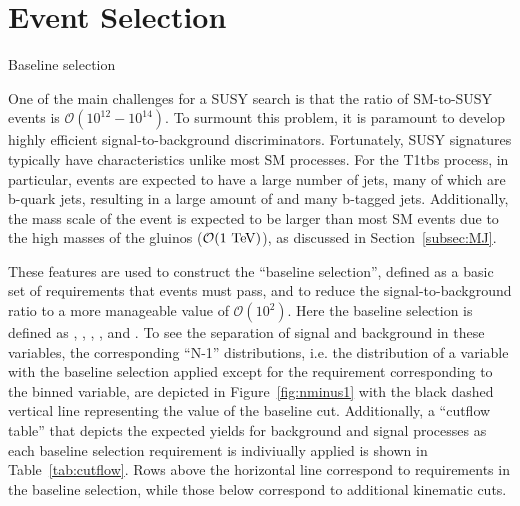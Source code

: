 \chapter{Event Selection}

\begin{section}{Baseline selection}

One of the main challenges for a SUSY search is that the ratio of SM-to-SUSY events is $\mathcal{O}(10^{12} - 10^{14})$.
To surmount this problem, it is paramount to develop highly efficient signal-to-background discriminators.
Fortunately, SUSY signatures typically have characteristics unlike most SM processes.
For the T1tbs process, in particular, events are expected to have a large number of jets, many of which are b-quark jets, resulting in a large amount of \HT and many b-tagged jets.
Additionally, the mass scale of the event is expected to be larger than most SM events due to the high masses of the gluinos ($\mathcal{O}(1~\mathrm{Te\kern -0.1em V})$), as discussed in Section~\ref{subsec:MJ}.

These features are used to construct the ``baseline selection'', defined as a basic set of requirements that events must pass, and to reduce the signal-to-background ratio to a more manageable value of $\mathcal{O}(10^2)$.
Here the baseline selection is defined as \baseNleps, \baseHT, \baseMJ, \baseNjets, and \baseNb.
To see the separation of signal and background in these variables, the corresponding ``N-1'' distributions, i.e. the distribution of a variable with the baseline selection applied except for the requirement corresponding to the binned variable, are depicted in Figure~\ref{fig:nminus1} with the black dashed vertical line representing the value of the baseline cut.
Additionally, a ``cutflow table'' that depicts the expected yields for background and signal processes as each baseline selection requirement is indiviually applied is shown in Table~\ref{tab:cutflow}.
Rows above the horizontal line correspond to requirements in the baseline selection, while those below correspond to additional kinematic cuts.


\end{section}
